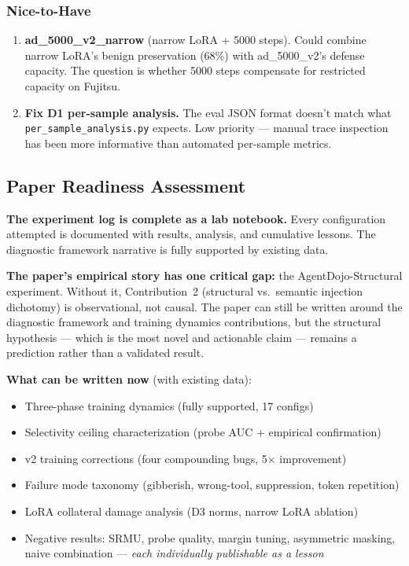 \documentclass[11pt]{article}
\begin{document}
\subsubsection{Nice-to-Have}

\begin{enumerate}
  \item \textbf{ad\_5000\_v2\_narrow} (narrow LoRA + 5000 steps).
        Could combine narrow LoRA's benign preservation (68\%) with
        ad\_5000\_v2's defense capacity.  The question is whether 5000
        steps compensate for restricted capacity on Fujitsu.

  \item \textbf{Fix D1 per-sample analysis.}
        The eval JSON format doesn't match what \texttt{per\_sample\_analysis.py}
        expects.  Low priority --- manual trace inspection has been more
        informative than automated per-sample metrics.
\end{enumerate}

\subsection{Paper Readiness Assessment}

\textbf{The experiment log is complete as a lab notebook.}  Every
configuration attempted is documented with results, analysis, and
cumulative lessons.  The diagnostic framework narrative is fully
supported by existing data.

\textbf{The paper's empirical story has one critical gap:}
the AgentDojo-Structural experiment.  Without it, Contribution~2
(structural vs.\ semantic injection dichotomy) is observational, not
causal.  The paper can still be written around the diagnostic framework
and training dynamics contributions, but the structural hypothesis
--- which is the most novel and actionable claim --- remains a
prediction rather than a validated result.

\textbf{What can be written now} (with existing data):
\begin{itemize}
  \item Three-phase training dynamics (fully supported, 17 configs)
  \item Selectivity ceiling characterization (probe AUC + empirical confirmation)
  \item v2 training corrections (four compounding bugs, 5$\times$ improvement)
  \item Failure mode taxonomy (gibberish, wrong-tool, suppression, token repetition)
  \item LoRA collateral damage analysis (D3 norms, narrow LoRA ablation)
  \item Negative results: SRMU, probe quality, margin tuning, asymmetric masking,
        naive combination --- \emph{each individually publishable as a lesson}
\end{itemize}
\end{document}
